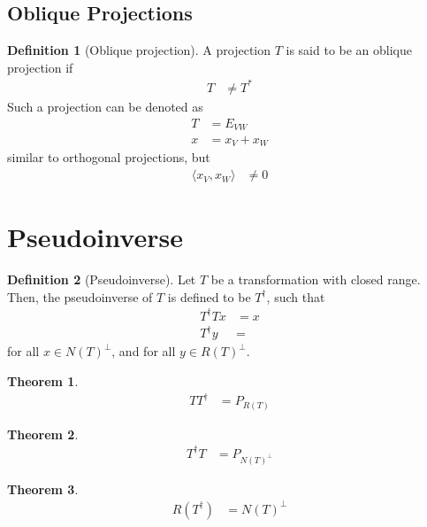 \documentclass[titlepage, fleqn, a4paper, 12pt, twoside]{article}
\theoremstyle{definition}
\newtheorem{definition}{Definition}
\theoremstyle{theorem}
\newtheorem{theorem}{Theorem}
\begin{document}
\subsection{Oblique Projections}

\begin{definition}[Oblique projection]
	A projection $T$ is said to be an oblique projection if
	\begin{align*}
		T &\neq T^*
	\end{align*}
	Such a projection can be denoted as
	\begin{align*}
		T &= E_{V W}\\
		x &= x_V + x_W
	\end{align*}
	similar to orthogonal projections, but
	\begin{align*}
		\langle x_V , x_W \rangle &\neq 0
	\end{align*}
\end{definition}

\section{Pseudoinverse}

\begin{definition}[Pseudoinverse]
	Let $T$ be a transformation with closed range.
	Then, the pseudoinverse of $T$ is defined to be $T^{\dagger}$, such that
	\begin{align*}
		T^{\dagger} T x &= x\\
		T^{\dagger} y &=
	\end{align*}
	for all $x \in {N(T)}^{\perp}$, and for all $y \in {R(T)}^{\perp}$.
\end{definition}

\begin{theorem}
	\begin{align*}
		T T^{\dagger} &= P_{R(T)}
	\end{align*}
\end{theorem}

\begin{theorem}
	\begin{align*}
		T^{\dagger} T &= P_{{N(T)}^{\perp}}
	\end{align*}
\end{theorem}

\begin{theorem}
	\begin{align*}
		R\left( T^{\dagger} \right) &= N(T)^{\perp}
	\end{align*}
\end{theorem}
\end{document}
